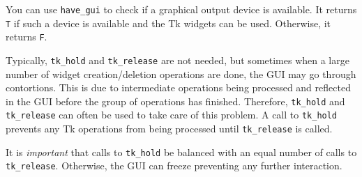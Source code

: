 You can use {\tt have\_gui} \label{have_gui-func}
to check if a graphical output device is available.
It returns {\tt T} if such a device is available and the Tk widgets
can be used. Otherwise, it returns {\tt F}.

Typically, {\tt tk\_hold} and {\tt tk\_release} \label{tk_hold-func}
\label{tk_release-func}
are not needed, but sometimes when a large number of widget
creation/deletion operations are done, the GUI may go through contortions. This
is due to intermediate operations being processed and reflected in the GUI before
the group of operations has finished. Therefore, {\tt tk\_hold} and 
{\tt tk\_release} can
often be used to take care of this problem. A call to {\tt tk\_hold} prevents any
Tk operations from being processed until {\tt tk\_release} is called.

It is {\em important} that calls to {\tt tk\_hold} be balanced with an equal
number of calls to {\tt tk\_release}. Otherwise, the GUI can freeze preventing
any further interaction.

